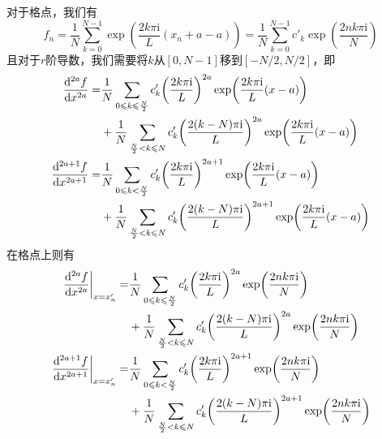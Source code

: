 \documentclass[UTF8,12pt]{article}
\begin{document}
        对于格点，我们有
        \begin{equation}
            f_n=\frac{1}{N}\sum_{k=0}^{N-1}{\exp(\frac{2k\pi\mathrm{i}}{L}(x_n+a-a))}=\frac{1}{N}\sum_{k=0}^{N-1}{c'_k\exp(\frac{2nk\pi\mathrm{i}}{N})}
        \end{equation}
        且对于$r$阶导数，我们需要将$k$从$[0,N-1]$移到$[-N/2, N/2]$，即
        \begin{align}
            \dv[2a]{f}{x}=&\frac{1}{N}\sum_{0\leqslant k\leqslant\frac{N}{2}}{c'_k\qty(\frac{2k\pi\mathrm{i}}{L})^{2a}\exp(\frac{2k\pi\mathrm{i}}{L}(x-a))} \nonumber \\
            &+\frac{1}{N}\sum_{\frac{N}{2}<k\leqslant N}{c'_k\qty(\frac{2(k-N)\pi\mathrm{i}}{L})^{2a}\exp(\frac{2k\pi\mathrm{i}}{L}(x-a))} \\
            \dv[2a+1]{f}{x}=&\frac{1}{N}\sum_{0\leqslant k<\frac{N}{2}}{c'_k\qty(\frac{2k\pi\mathrm{i}}{L})^{2a+1}\exp(\frac{2k\pi\mathrm{i}}{L}(x-a))} \nonumber \\
            &+\frac{1}{N}\sum_{\frac{N}{2}<k\leqslant N}{c'_k\qty(\frac{2(k-N)\pi\mathrm{i}}{L})^{2a+1}\exp(\frac{2k\pi\mathrm{i}}{L}(x-a))}
        \end{align}
        在格点上则有
        \begin{align}
            \eval{\dv[2a]{f}{x}}_{x=x'_n}=&\frac{1}{N}\sum_{0\leqslant k\leqslant\frac{N}{2}}{c'_k\qty(\frac{2k\pi\mathrm{i}}{L})^{2a}\exp(\frac{2nk\pi\mathrm{i}}{N})} \nonumber \\
            &+\frac{1}{N}\sum_{\frac{N}{2}<k\leqslant N}{c'_k\qty(\frac{2(k-N)\pi\mathrm{i}}{L})^{2a}\exp(\frac{2nk\pi\mathrm{i}}{N})} \\
            \eval{\dv[2a+1]{f}{x}}_{x=x'_n}=&\frac{1}{N}\sum_{0\leqslant k<\frac{N}{2}}{c'_k\qty(\frac{2k\pi\mathrm{i}}{L})^{2a+1}\exp(\frac{2nk\pi\mathrm{i}}{N})} \nonumber \\
            &+\frac{1}{N}\sum_{\frac{N}{2}<k\leqslant N}{c'_k\qty(\frac{2(k-N)\pi\mathrm{i}}{L})^{2a+1}\exp(\frac{2nk\pi\mathrm{i}}{N})}
        \end{align}
\end{document}
